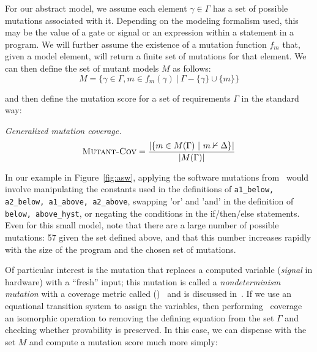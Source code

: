 For our abstract model, we assume each element $\gamma \in \Gamma$ has a set of possible mutations associated with it.  Depending on the modeling formalism used, this may be the value of a gate or signal or an expression within a statement in a program.  We will further assume the existence of a mutation function $f_{m}$ that, given a model element, will return a finite set of mutations for that element.  We can then define the set of mutant models $M$ as follows:
\[
    M = \{ \gamma \in \Gamma, m \in f_{m}(\gamma)\ |\ \Gamma - \{\gamma\} \cup \{m\} \}
\]

\noindent and then define the mutation score for a set of requirements $\Gamma$ in the standard way:

\begin{definition} {\emph{Generalized mutation coverage.} } \\
\[
   \text{\sc Mutant-Cov} = \frac{ | \{m \in M(\Gamma)~|~ m \nvdash \Delta\} |}{|M(\Gamma)|}
\]
\end{definition}


In our example in Figure~\ref{fig:asw}, applying the software mutations from~\cite{Andrews06:mutation} would involve manipulating the constants used in the definitions of \texttt{a1\_below, a2\_below, a1\_above, a2\_above}, swapping 'or' and 'and' in the definition of \texttt{below, above\_hyst}, or negating the conditions in the if/then/else statements.  Even for this small model, note that there are a large number of possible mutations: 57 given the set defined above, and that this number increases rapidly with the size of the program and the chosen set of mutations.



Of particular interest is the mutation that replaces a computed variable ({\em signal} in hardware) with a ``fresh'' input; this mutation is called a {\em nondeterminism mutation} with a coverage metric called (\nondetcov)~\cite{chockler2010coverage} and is discussed in~\cite{Kupferman:2006:SCF,kupferman_theory_2008,chockler2010coverage}.  If we use an equational transition system to assign the variables, then performing \nondetcov\ coverage an isomorphic operation to removing the defining equation from the set $\Gamma$ and checking whether provability is preserved.  In this case, we can dispense with the set $M$ and compute a mutation score much more simply:

